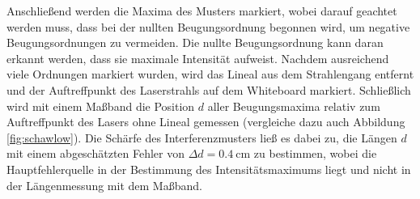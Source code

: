 \documentclass[11pt, a4paper]{article}
\numberwithin{equation}{section}
\begin{document}
Anschließend werden die Maxima des Musters markiert, wobei darauf geachtet werden muss, dass bei der nullten Beugungsordnung begonnen wird, um negative Beugungsordnungen zu vermeiden.
Die nullte Beugungsordnung kann daran erkannt werden, dass sie maximale Intensität aufweist.
Nachdem ausreichend viele Ordnungen markiert wurden, wird das Lineal aus dem Strahlengang entfernt und der Auftreffpunkt des Laserstrahls auf dem Whiteboard markiert.
Schließlich wird mit einem Maßband die Position $d$ aller Beugungsmaxima relativ zum Auftreffpunkt des Lasers ohne Lineal gemessen (vergleiche dazu auch Abbildung \ref{fig:schawlow}).
Die Schärfe des Interferenzmusters ließ es dabei zu, die Längen $d$ mit einem abgeschätzten Fehler von $\Delta d = \SI{0.4}{\centi\metre}$ zu bestimmen, wobei die Hauptfehlerquelle in der Bestimmung des Intensitätsmaximums liegt und nicht in der Längenmessung mit dem Maßband.
\end{document}
